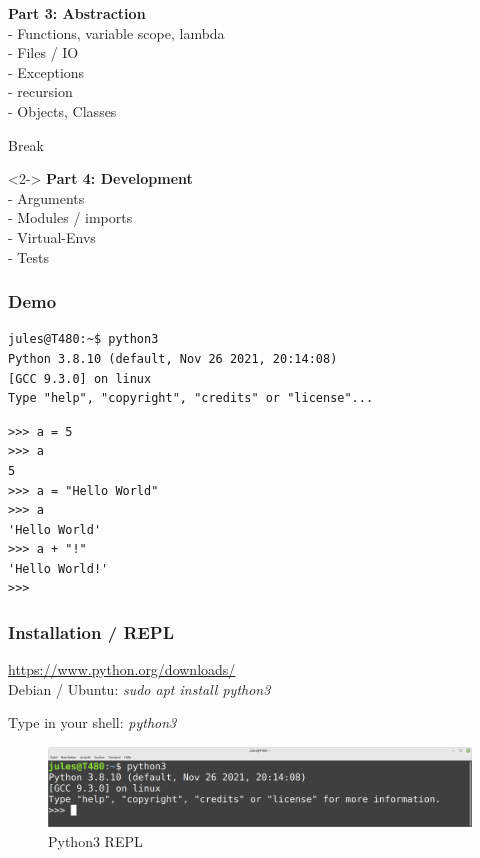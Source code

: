 \documentclass{beamer}
\begin{document}
\begin{frame}
	\begin{block}{}
		\textbf{Part 3: Abstraction}\\
		- Functions, variable scope, lambda\\
		- Files / IO\\
		- Exceptions\\
		- recursion\\
		- Objects, Classes\\
	\end{block}
	\begin{exampleblock}{}
	Break
	\end{exampleblock}
	\begin{block}{}<2->
		\textbf{Part 4: Development}\\
		- Arguments\\
		- Modules / imports\\
		- Virtual-Envs\\
		- Tests
	\end{block}
\end{frame}

\begin{frame}[fragile]
	\frametitle{Demo}
	\begin{verbatim}
jules@T480:~$ python3
Python 3.8.10 (default, Nov 26 2021, 20:14:08) 
[GCC 9.3.0] on linux
Type "help", "copyright", "credits" or "license"...
	\end{verbatim}
\begin{verbatim}
>>> a = 5
>>> a
5
>>> a = "Hello World"
>>> a
'Hello World'
>>> a + "!"
'Hello World!'
>>> 
	\end{verbatim}
\end{frame}

\begin{frame}
	\frametitle{Installation / REPL}
	\begin{center}
		\url{https://www.python.org/downloads/}\\
		Debian / Ubuntu: \textit{sudo apt install python3}\\
	\end{center}
	\begin{center}
		Type in your shell: \textit{python3}
	\end{center}
\end{frame}

\begin{frame}
	\begin{figure}
		\includegraphics[width=12cm]{figures/console.png}
		\caption{Python3 REPL}
	\end{figure}
\end{frame}
\end{document}
